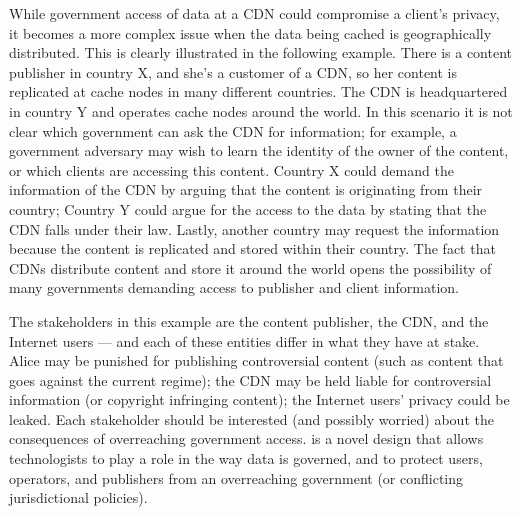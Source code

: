 While government access of data at a CDN could compromise a client's privacy,
it becomes a more complex issue when the data being cached is geographically
distributed. This is clearly illustrated in the following example.  There is a
content publisher in  country X, and she's a customer of a CDN, so her content
is replicated at cache nodes in many  different countries.  The CDN is
headquartered  in country Y and operates cache nodes around the world.  In
this scenario it is not clear which government can ask the CDN for
information; for  example, a government adversary may wish to learn the
identity of the owner of the content, or which clients are accessing  this
content.  Country X could demand the information of the CDN by arguing that
the content is originating  from their country; Country Y could argue for the
access to the data by stating that the CDN falls under their  law.  Lastly,
another country may request the information because the content is replicated
and stored within  their country.  The fact that CDNs distribute content and
store it around the world opens the possibility of  many governments demanding
access to publisher and client information.

The stakeholders in this example are the content publisher, the CDN, and the
Internet users --- and each of these entities differ in what  they have at
stake.  Alice may be punished for publishing controversial content (such as
content that  goes against the current regime); the CDN  may be held liable
for controversial information (or copyright infringing content); the Internet
users'  privacy could be leaked.  Each stakeholder should be interested (and
possibly worried) about the  consequences of overreaching government access.
\system{} is a novel design that allows technologists to play  a role in the
way data is governed, and to protect users, operators, and publishers from an
overreaching government (or  conflicting jurisdictional policies).
\fi 
